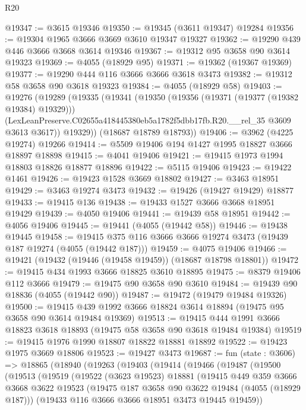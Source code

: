 \begin{lexlean}{R20}
\begin{coremodule}
@19347 := @3615 @19346
@19350 := @19345 (@3611 @19347) @19284
@19356 := @19304 @1965 @3666 @3669 @3610 @19347 @19327
@19362 := @19290 @439 @446 @3666 @3668 @3614 @19346
@19367 := @19312 @95 @3658 @90 @3614 @19323
@19369 := @4055 (@18929 @95)
@19371 := @19362 (@19367 @19369)
@19377 := @19290 @444 @116 @3666 @3666 @3618 @3473
@19382 := @19312 @58 @3658 @90 @3618 @19323
@19384 := @4055 (@18929 @58)
@19403 := @19276
    (@19289
      (@19335
        (@19341
          (@19350
            (@19356 (@19371 (@19377 (@19382 @19384) @19329)))
            (LexLeanPreserve.C02655a418445380eb5a1782f5dbb17fb.R20.__rel_35 @3609 @3613 @3617))
          @19329))
      (@18687 @18789 @18793))
@19406 := @3962 (@4225 @19274) @19266
@19414 := @5509 @19406 @194 @1427 @1995 @18827 @3666 @18897 @18898
@19415 := @4041 @19406
@19421 := @19415 @1973 @1994 @18803 @18826 @18877 @18896
@19422 := @5115 @19406
@19423 := @19422 @1461
@19426 := @19423 @1528 @3669 @18802
@19427 := @3463 @18951
@19429 := @3463 @19274 @3473
@19432 := @19426 (@19427 @19429) @18877
@19433 := @19415 @136
@19438 := @19433 @1527 @3666 @3668 @18951 @19429
@19439 := @4050 @19406
@19441 := @19439 @58 @18951
@19442 := @4056 @19406
@19445 := @19441 (@4055 (@19442 @58))
@19446 := @19438 @19445
@19458 := @19415 @375 @116 @3666 @3666 @19274 @3473 (@19439 @187 @19274 (@4055 (@19442 @187)))
@19459 := @4075 @19406
@19466 := @19421 (@19432 (@19446 (@19458 @19459)) (@18687 @18798 @18801))
@19472 := @19415 @434 @1993 @3666 @18825 @3610 @18895
@19475 := @8379 @19406 @112 @3666
@19479 := @19475 @90 @3658 @90 @3610
@19484 := @19439 @90 @18836 (@4055 (@19442 @90))
@19487 := @19472 (@19479 @19484 @19326)
@19500 := @19415 @439 @1992 @3666 @18824 @3614 @18894 (@19475 @95 @3658 @90 @3614 @19484 @19369)
@19513 := @19415 @444 @1991 @3666 @18823 @3618 @18893 (@19475 @58 @3658 @90 @3618 @19484 @19384)
@19519 := @19415 @1976 @1990 @18807 @18822 @18881 @18892
@19522 := @19423 @1975 @3669 @18806
@19523 := @19427 @3473
@19687 := fun (state : @3606) =>
  @18865
    (@18940
      (@19263
        (@19403
          (@19414
            (@19466
              (@19487
                (@19500
                  (@19513
                    (@19519
                      (@19522
                        (@3623 @19523)
                        @18881
                        (@19415
                          @449
                          @359
                          @3666
                          @3668
                          @3622
                          @19523
                          (@19475 @187 @3658 @90 @3622 @19484 (@4055 (@18929 @187)))
                          (@19433 @116 @3666 @3666 @18951 @3473 @19445 @19459))

\end{coremodule}
\end{lexlean}
